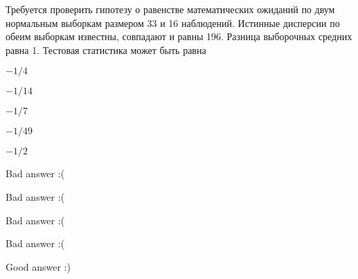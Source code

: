 
\begin{question}
Требуется проверить гипотезу о равенстве математических ожиданий по двум
нормальным выборкам размером 33 и 16 наблюдений. Истинные дисперсии по
обеим выборкам известны, совпадают и равны 196. Разница выборочных
средних равна 1. Тестовая статистика может быть равна
\begin{answerlist}
  \item \(-1/4\)
  \item \(-1/14\)
  \item \(-1/7\)
  \item \(-1/49\)
  \item \(-1/2\)
\end{answerlist}
\end{question}

\begin{solution}
\begin{answerlist}
  \item Bad answer :(
  \item Bad answer :(
  \item Bad answer :(
  \item Bad answer :(
  \item Good answer :)
\end{answerlist}
\end{solution}

